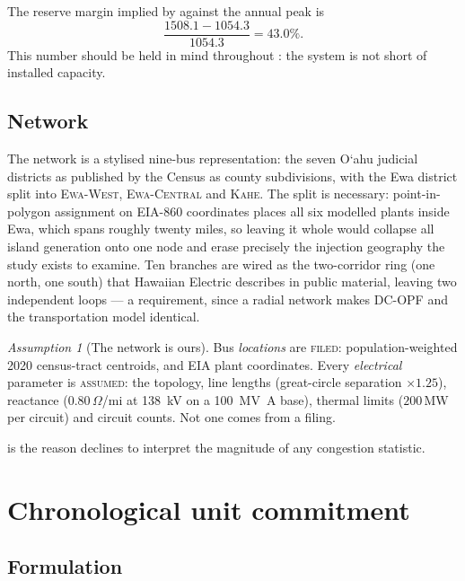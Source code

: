 \documentclass[11pt,a4paper]{article}
\theoremstyle{definition}
\theoremstyle{plain}
\theoremstyle{remark}
\newtheorem{assumption}[definition]{Assumption}
\newcommand{\MW}{\,\mathrm{MW}}
\newcommand{\okina}{\textquoteleft}
\newcommand{\Oahu}{O\okina ahu}
\newcommand{\Filed}{\textcolor{filed}{\textsc{filed}}}
\newcommand{\Assum}{\textcolor{assum}{\textsc{assumed}}}
\begin{document}
The reserve margin implied by  against the annual peak is
\[
  \frac{1508.1 - 1054.3}{1054.3} = 43.0\%.
\]
This number should be held in mind throughout : the system is
not short of installed capacity.

\subsection{Network}
\label{sec:network}

The network is a stylised nine-bus representation: the seven \Oahu{} judicial
districts as published by the Census as county subdivisions, with the Ewa
district split into \textsc{Ewa-West}, \textsc{Ewa-Central} and \textsc{Kahe}.
The split is necessary: point-in-polygon assignment on EIA-860 coordinates
places all six modelled plants inside Ewa, which spans roughly twenty miles, so
leaving it whole would collapse all island generation onto one node and erase
precisely the injection geography the study exists to examine. Ten branches are
wired as the two-corridor ring (one north, one south) that Hawaiian Electric
describes in public material, leaving two independent loops --- a requirement,
since a radial network makes DC-OPF and the transportation model identical.

\begin{assumption}[The network is ours]
\label{as:network}
Bus \emph{locations} are \Filed{}: population-weighted 2020 census-tract
centroids, and EIA plant coordinates. Every \emph{electrical} parameter is
\Assum{}: the topology, line lengths (great-circle separation $\times 1.25$),
reactance ($0.80\,\Omega$/mi at \SI{138}{\kilo\volt} on a \SI{100}{\mega\volt\ampere}
base), thermal limits ($200\MW$ per circuit) and circuit counts. Not one comes
from a filing.
\end{assumption}

 is the reason  declines to interpret the
magnitude of any congestion statistic.

\section{Chronological unit commitment}
\label{sec:model}

\subsection{Formulation}
\end{document}
